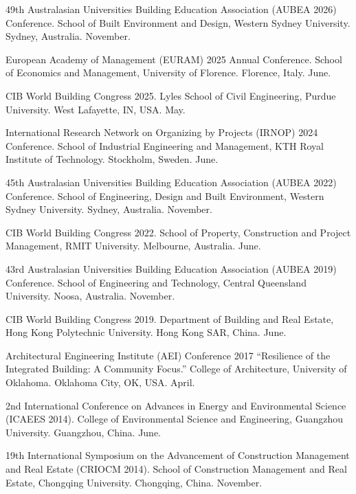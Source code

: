 \documentclass[11pt,a4paper]{report} %
\begin{document}
    \begin{tablist}

        \item[2026] \tab{}49th Australasian Universities Building Education Association (AUBEA 2026) Conference. School of Built Environment and Design, Western Sydney University. Sydney, Australia. November.
        
        \item[2025] \tab{}European Academy of Management (EURAM) 2025 Annual Conference. School of Economics and Management, University of Florence. Florence, Italy. June. 
        
        \item[2025] \tab{}CIB World Building Congress 2025. Lyles School of Civil Engineering, Purdue University. West Lafayette, IN, USA. May. 
        
        \item[2024] \tab{}International Research Network on Organizing by Projects (IRNOP) 2024 Conference. School of Industrial Engineering and Management, KTH Royal Institute of Technology. Stockholm, Sweden. June.
        
        \item[2022] \tab{}45th Australasian Universities Building Education Association (AUBEA 2022) Conference. School of Engineering, Design and Built Environment, Western Sydney University. Sydney, Australia. November.
        
        \item[2022] \tab{}CIB World Building Congress 2022. School of Property, Construction and Project Management, RMIT University. Melbourne, Australia. June.
        
        \item[2019] \tab{}43rd Australasian Universities Building Education Association (AUBEA 2019) Conference. School of Engineering and Technology, Central Queensland University. Noosa, Australia. November. 
        
        \item[2019] \tab{}CIB World Building Congress 2019. Department of Building and Real Estate, Hong Kong Polytechnic University. Hong Kong SAR, China. June.
        
        \item[2017] \tab{}Architectural Engineering Institute (AEI) Conference 2017 “Resilience of the Integrated Building: A Community Focus.” College of Architecture, University of Oklahoma. Oklahoma City, OK, USA. April.
        
        \item[2014] \tab{}2nd International Conference on Advances in Energy and Environmental Science (ICAEES 2014). College of Environmental Science and Engineering, Guangzhou University. Guangzhou, China. June.
        
        \item[2014] \tab{}19th International Symposium on the Advancement of Construction Management and Real Estate (CRIOCM 2014). School of Construction Management and Real Estate, Chongqing University. Chongqing, China. November.

    \end{tablist}
\end{document}
